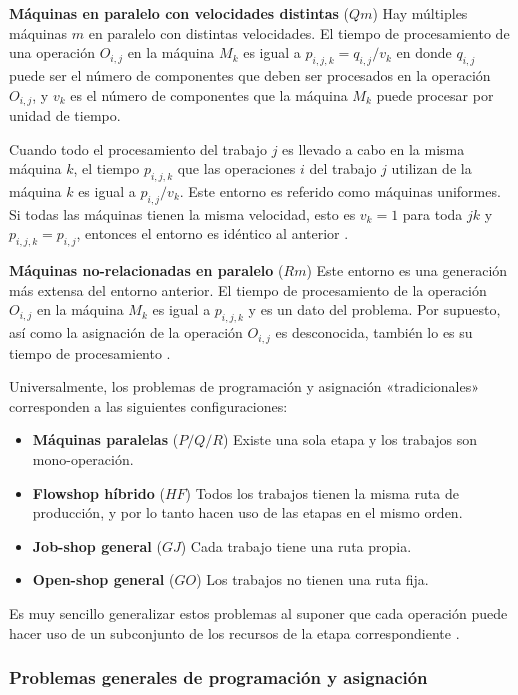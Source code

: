 \documentclass[spanish,draft,12pt,headsepline,footsepline,paper=letter]{scrreprt}
\begin{document}
\textbf{Máquinas en paralelo con velocidades distintas} ($Qm$) Hay múltiples máquinas $m$ en paralelo con distintas velocidades.
El tiempo de procesamiento de una operación $O_{i,j}$ en la máquina $M_k$ es igual a $p_{i,j,k} = q_{i,j}/v_k$ en donde $q_{i,j}$ puede ser el número de componentes que deben ser procesados en la operación $O_{i,j}$, y $v_k$ es el número de componentes que la máquina $M_k$ puede procesar por unidad de tiempo.

Cuando todo el procesamiento del trabajo $j$ es llevado a cabo en la misma máquina $k$, el tiempo $p_{i,j,k}$ que las operaciones $i$ del trabajo $j$ utilizan de la máquina $k$ es igual a $p_{i,j}/v_k$. Este entorno es referido como máquinas uniformes. Si todas las máquinas tienen la misma velocidad, esto es $v_k = 1$ para toda $jk$ y $p_{i,j,k} = p_{i,j}$, entonces el entorno es idéntico al anterior \citep[p.~14, p.~8]{Pinedo1995,TKindt2002}.

\textbf{Máquinas no-relacionadas en paralelo} ($Rm$) Este entorno es una generación más extensa del entorno anterior. El tiempo de procesamiento de la operación $O_{i,j}$ en la máquina $M_k$ es igual a $p_{i,j,k}$ y es un dato del problema. Por supuesto, así como la asignación de la operación $O_{i,j}$ es desconocida, también lo es su tiempo de procesamiento \citep[p.~14, p.~9]{Pinedo1995,TKindt2002}.

Universalmente, los problemas de programación y asignación «tradicionales» corresponden a las siguientes configuraciones:
\begin{itemize} 
\item\textbf{Máquinas paralelas} ($P/Q/R$) Existe una sola etapa y los trabajos son mono-operación.
\item\textbf{Flowshop híbrido} ($HF$) Todos los trabajos tienen la misma ruta de producción, y por lo tanto hacen uso de las etapas en el mismo orden.
\item\textbf{Job-shop general} ($GJ$) Cada trabajo tiene una ruta propia.
\item\textbf{Open-shop general} ($GO$) Los trabajos no tienen una ruta fija.
\end{itemize}
Es muy sencillo generalizar estos problemas al suponer que cada operación puede hacer uso de un subconjunto de los recursos de la etapa correspondiente \citep[p.~9]{TKindt2002}.

\subsubsection{Problemas generales de programación y asignación}
\end{document}
